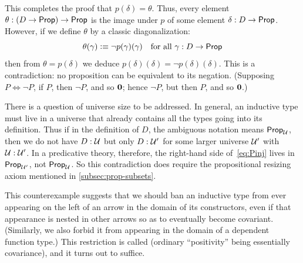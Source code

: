 This completes the proof that $p(\delta)=\theta$.
Thus, every element $\theta:(D\to\mathsf{Prop})\to\mathsf{Prop}$ is the image under $p$ of some element $\delta:D\to\mathsf{Prop}$.
However, if we define $\theta$ by a classic diagonalization:
\[ \theta(\gamma) \vcentcolon\equiv \neg p(\gamma)(\gamma) \quad\text{for all $\gamma:D\to\mathsf{Prop}$} \]
then from $\theta = p(\delta)$ we deduce $p(\delta)(\delta) = \neg p(\delta)(\delta)$.
This is a contradiction: no proposition can be equivalent to its negation.
(Supposing $P\Leftrightarrow \neg P$, if $P$, then $\neg P$, and so $\mathbf{0}$; hence $\neg P$, but then $P$, and so $\mathbf{0}$.)

\begin{rmk}
  There is a question of universe size to be addressed.
  In general, an inductive type must live in a universe that already contains all the types going into its definition.
  Thus if in the definition of $D$, the ambiguous notation \prop means $\mathsf{Prop}_{\mathcal{U}}$, then we do not have $D:\mathcal{U}$ but only $D:\mathcal{U}'$ for some larger universe $\mathcal{U}'$ with $\mathcal{U}:\mathcal{U}'$.
  In a predicative theory, therefore, the right-hand side of~\eqref{eq:Pinj} lives in $\mathsf{Prop}_{\mathcal{U}'}$, not $\mathsf{Prop}_\mathcal{U}$.
  So this contradiction does require the propositional resizing axiom
  mentioned in \cref{subsec:prop-subsets}.
\end{rmk}

%
This counterexample suggests that we should ban an inductive type from ever appearing on the left of an arrow in the domain of its constructors, even if that appearance is nested in other arrows so as to eventually become covariant.
(Similarly, we also forbid it from appearing in the domain of a dependent function type.)
This restriction is called 
%
%
(ordinary ``positivity'' being essentially covariance), and it turns out to suffice.

